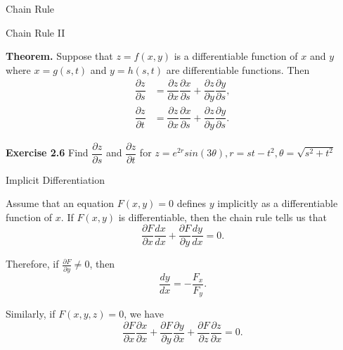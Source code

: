 \documentclass[aspectratio=169, UTF8]{ctexbeamer}
\begin{document}
    \begin{frame}[t]{Chain Rule}
        \begin{block}{Chain Rule II}
            \par \textbf{Theorem.} Suppose that $z =f(x,y)$ is a differentiable function of $x$ and $y$ where $x = g(s,t)$ and $y = h(s,t)$ are differentiable functions. Then 
            \begin{equation*}
                \begin{aligned}
                    \dfrac{\partial z}{\partial s} &= \dfrac{\partial z}{\partial x} \dfrac{\partial x}{\partial s} + \dfrac{\partial z}{\partial y} \dfrac{\partial y}{\partial s} ,\\
                    \dfrac{\partial z}{\partial t} &= \dfrac{\partial z}{\partial x} \dfrac{\partial x}{\partial s} + \dfrac{\partial z}{\partial y} \dfrac{\partial y}{\partial s} .
                \end{aligned}
            \end{equation*}
        \end{block}
        \par \textbf{Exercise 2.6} Find $\dfrac{\partial z}{\partial s}$ and $\dfrac{\partial z}{\partial t}$ for $z = e^{2r}sin(3\theta), r = st - t^2, \theta = \sqrt{s^2+t^2}$
    \end{frame}

    \begin{frame}[t]{Implicit Differentiation}
        \par Assume that an equation $F(x,y) = 0$ defines $y$ implicitly as a differentiable function of $x$. If $F(x,y)$ is differentiable, then the chain rule tells us that 
        \begin{equation*}
            \dfrac{\partial F}{\partial x} \dfrac{d x}{d x} + \dfrac{\partial F}{\partial y} \dfrac{d y}{d x} = 0.
        \end{equation*}
        \par Therefore, if $\frac{\partial F}{\partial y} \neq 0$, then 
        \begin{equation*}
            \dfrac{dy}{dx} = - \dfrac{F_x}{F_y} .
        \end{equation*}
        \par Similarly, if $F(x,y,z) = 0$, we have 
        \begin{equation*}
            \dfrac{\partial F}{\partial x} \dfrac{\partial x}{\partial x} + \dfrac{\partial F}{\partial y} \dfrac{\partial y}{\partial x} + \dfrac{\partial F}{\partial z} \dfrac{\partial z}{\partial x} = 0.
        \end{equation*}
    \end{frame}
    
\end{document}

